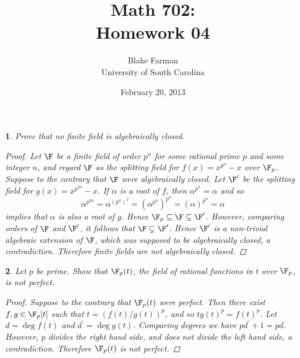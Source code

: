 \documentclass[10pt]{amsart}
\author{Blake Farman\\University of South Carolina}
\title{Math 702:\\Homework 04}
\date{February 20, 2013}
\begin{document}
\maketitle

\providecommand{\p}{\mathfrak{p}}
\providecommand{\m}{\mathfrak{m}}

\newtheorem{thm}{}
\newtheorem{lem}{Lemma}


\begin{thm}
  Prove that no finite field is algebraically closed.
  \begin{proof}
    Let $\F$ be a finite field of order $p^n$ for some rational prime $p$ and some integer $n$, and regard $\F$ as the splitting field for $f(x) = x^{p^n} - x$ over $\F_p$.
    Suppose to the contrary that $\F$ were algebraically closed.
    Let $\F^\prime$ be the splitting field for $g(x) = x^{p^{2n}} - x$.
    If $\alpha$ is a root of $f$, then $\alpha^{p^n} = \alpha$ and so
    $$\alpha^{p^{2n}} = \alpha^{(p^n)^2} = \left(\alpha^{p^n}\right)^{p^n} = (\alpha)^{p^n} = \alpha$$ 
    implies that $\alpha$ is also a root of $g$.
    Hence $\F_p \subseteq \F \subseteq \F^\prime$.
    However, comparing orders of $\F$ and $\F^\prime$, it follows that $\F \subsetneq \F^\prime$.
    Hence $\F^\prime$ is a non-trivial algebraic extension of $\F$, which was supposed to be algebraically closed, a contradiction.
    Therefore finite fields are not algebraically closed.
  \end{proof}
\end{thm}

\begin{thm}
  Let $p$ be prime.
  Show that $\F_p(t)$, the field of rational functions in $t$ over $\F_p$, is not perfect.
  \begin{proof}
    Suppose to the contrary that $\F_p(t)$ were perfect.
    Then there exist $f, g \in \F_p[t]$ such that $t = (f(t)/g(t))^p$, and so $tg(t)^p = f(t)^p$.
    Let $d = \deg{f(t)}$ and $d^\prime = \deg{g(t)}$.
    Comparing degrees we have $pd^\prime + 1 = pd$.
    However, $p$ divides the right hand side, and does not divide the left hand side, a contradiction.
    Therefore $\F_p(t)$ is not perfect.
  \end{proof}
\end{thm}
\end{document}
